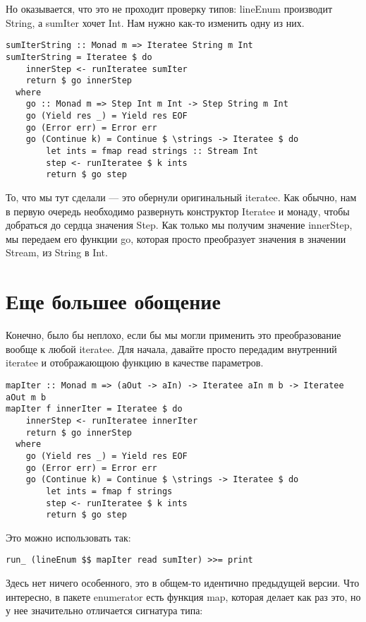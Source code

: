 Но оказывается, что это не проходит проверку типов: lineEnum производит String, а sumIter хочет Int. Нам нужно как-то изменить одну из них.

\begin{lstlisting}
sumIterString :: Monad m => Iteratee String m Int
sumIterString = Iteratee $ do
    innerStep <- runIteratee sumIter
    return $ go innerStep
  where
    go :: Monad m => Step Int m Int -> Step String m Int
    go (Yield res _) = Yield res EOF
    go (Error err) = Error err
    go (Continue k) = Continue $ \strings -> Iteratee $ do
        let ints = fmap read strings :: Stream Int
        step <- runIteratee $ k ints
        return $ go step
\end{lstlisting}%

То, что мы тут сделали --- это обернули оригинальный iteratee. Как обычно, нам в первую очередь необходимо развернуть конструктор Iteratee и монаду, чтобы добраться до сердца значения Step. Как только мы получим значение innerStep, мы передаем его функции go, которая просто преобразует значения в значении Stream, из String в Int.

\section{Еще большее обощение}

Конечно, было бы неплохо, если бы мы могли применить это преобразование вообще к любой iteratee. Для начала, давайте просто передадим внутренний iteratee и отображающюю функцию в качестве параметров.

\begin{lstlisting}
mapIter :: Monad m => (aOut -> aIn) -> Iteratee aIn m b -> Iteratee aOut m b
mapIter f innerIter = Iteratee $ do
    innerStep <- runIteratee innerIter
    return $ go innerStep
  where
    go (Yield res _) = Yield res EOF
    go (Error err) = Error err
    go (Continue k) = Continue $ \strings -> Iteratee $ do
        let ints = fmap f strings
        step <- runIteratee $ k ints
        return $ go step
\end{lstlisting}%

Это можно использовать так:

\begin{lstlisting}
run_ (lineEnum $$ mapIter read sumIter) >>= print
\end{lstlisting}%

Здесь нет ничего особенного, это в общем-то идентично предыдущей версии. Что интересно, в пакете enumerator есть  функция map, которая делает как раз это, но у нее значительно отличается сигнатура типа:

